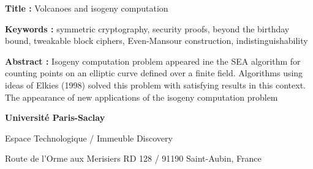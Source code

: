 \documentclass[a4paper, titlepage, 12pt]{book}
\newcommand{\titreeng}{Volcanoes and isogeny computation}
\begin{document}

\begin{breakbox}

\noindent\textbf{Title : }\titreeng

\vspace{2ex}

\noindent\textbf{Keywords : }symmetric cryptography, security proofs, beyond the birthday bound, 
tweakable block ciphers, Even-Mansour construction, indistinguishability

\begin{multicols}{2}
\noindent\textbf{Abstract : }
Isogeny computation problem appeared ine the SEA algorithm for counting points on an elliptic curve defined over a finite field. Algorithms using ideas of Elkies (1998) solved this problem with satisfying results in this context. The appearance of new applications of the isogeny computation problem
\end{multicols}
\end{breakbox}


{\tiny
\noindent
\textbf{Université Paris-Saclay}

\noindent
Espace Technologique / Immeuble Discovery

\noindent
Route de l’Orme aux Merisiers RD 128 / 91190 Saint-Aubin, France 

}
\end{document}
